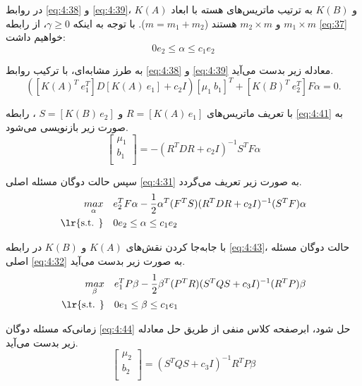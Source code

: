 در روابط \ref{eq:4:38} و \ref{eq:4:39}، $K(A)$ و $K(B)$ به ترتیب ماتریس‌های هسته با ابعاد  $m_{1} \times m$ و $m_{2} \times m$ هستند ($m=m_{1}+m_{2}$). با توجه به اینکه  $\gamma \geq 0$، از رابطه \ref{eq:37} خواهیم داشت:
\begin{equation}\label{eq:4:40}
0e_{2} \leq \alpha \leq c_{1}e_{2}
\end{equation}

به طرز مشابه‌ای، با ترکیب روابط \ref{eq:4:38} و \ref{eq:4:39} معادله زیر بدست می‌آید.
\begin{equation}\label{eq:4:41}
([K(A)^{T}\ e^{T}_{1}]D[K(A)\ e_{1}] + c_{2}I)[\mu_{1}\ b_{1}]^{T} + [K(B)^{T}\ e^{T}_{2}]F\alpha = 0.
\end{equation}

با تعریف ماتریس‌های  $R=[K(A)\,e_{1}]$ و $S=[K(B)\,e_{2}]$ ، رابطه \ref{eq:4:41} به صورت زیر بازنویسی می‌شود.
\begin{equation}\label{eq:4:42}
\left[ \begin{matrix}
{{\mu}_{1}}  \\
{{b}_{1}}  \\
\end{matrix} \right] = -(R^{T}DR+c_{2}I)^{-1}S^{T}F\alpha
\end{equation}

سپس حالت دوگان مسئله اصلی \ref{eq:4:31} به صورت زیر تعریف می‌گردد.
\begin{equation}\label{eq:4:43}
\begin{split}
\mathop{{max}}\limits_{\alpha} \quad & e_{2}^{T}F\alpha-\frac{1}{2}{{\alpha }^{T}}(F^{T}S){(R^{T}DR+c_{2}I)^{-1}}{({S}^{T}F)}\alpha   \\
\textrm{\lr{s.t. }} \quad & 0{{e}_{2}}\le \alpha \le {c_{1}}{{e}_{2}}
\end{split}
\end{equation}

با جا‌به‌جا کردن نقش‌های  $K(A)$ و $K(B)$  در رابطه \ref{eq:4:43}، حالت دوگان مسئله اصلی \ref{eq:4:32} به صورت زیر بدست
می‌آید.
\begin{equation}\label{eq:4:44}
\begin{split}
\mathop{{max}}\limits_{\beta} \quad & e_{1}^{T}P\beta-\frac{1}{2}{{\beta}^{T}}(P^{T}R){(S^{T}QS+c_{3}I)^{-1}}{({R}^{T}P)}\beta   \\
\textrm{\lr{s.t. }} \quad & 0{{e}_{1}}\le \beta \le {c_{1}}{{e}_{1}}
\end{split}
\end{equation}

زمانی‌که مسئله دوگان \ref{eq:4:44} حل شود، ابرصفحه کلاس منفی از طریق حل معادله زیر بدست می‌آید.
\begin{equation}\label{eq:4:45}
\left[ \begin{matrix}
{{\mu}_{2}}  \\
{{b}_{2}}  \\
\end{matrix} \right] = (S^{T}QS+c_{3}I)^{-1}R^{T}P\beta
\end{equation}

